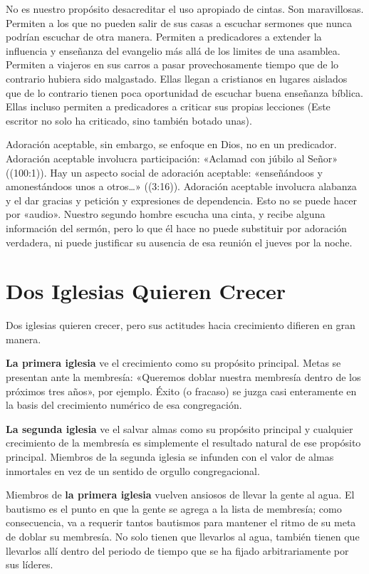 \documentclass[12pt, twoside, openright]{book}
\begin{document}
No es nuestro propósito desacreditar el uso apropiado de cintas. Son maravillosas. Permiten a los que no pueden salir de sus casas a escuchar sermones que nunca podrían escuchar de otra manera. Permiten a predicadores a extender la influencia y enseñanza del evangelio más allá de los limites de una asamblea. Permiten a viajeros en sus carros a pasar provechosamente tiempo que de lo contrario hubiera sido malgastado. Ellas llegan a cristianos en lugares aislados que de lo contrario tienen poca oportunidad de escuchar buena enseñanza bíblica. Ellas incluso permiten a predicadores a criticar sus propias lecciones (Este escritor no solo ha criticado, sino también botado unas).

Adoración aceptable, sin embargo, se enfoque en Dios, no en un predicador. Adoración aceptable involucra participación: «Aclamad con júbilo al Señor» ((100:1)). Hay un aspecto social de adoración aceptable: «enseñándoos y amonestándoos unos a otros…» ((3:16)). Adoración aceptable involucra alabanza y el dar gracias y petición y expresiones de dependencia. Esto no se puede hacer por «audio». Nuestro segundo hombre escucha una cinta, y recibe alguna información del sermón, pero lo que él hace no puede substituir por adoración verdadera, ni puede justificar su ausencia de esa reunión el jueves por la noche. 

\section{Dos Iglesias Quieren Crecer}
Dos iglesias quieren crecer, pero sus actitudes hacia crecimiento difieren en gran manera.

\textbf{La primera iglesia} ve el crecimiento como su propósito principal. Metas se presentan ante la membresía: «Queremos doblar nuestra membresía dentro de los próximos tres años», por ejemplo. Éxito (o fracaso) se juzga casi enteramente en la basis del crecimiento numérico de esa congregación. 

\textbf{La segunda iglesia} ve el salvar almas como su propósito principal y cualquier crecimiento de la membresía es simplemente el resultado natural de ese propósito principal. Miembros de la segunda iglesia se infunden con el valor de almas inmortales en vez de un sentido de orgullo congregacional. 

Miembros de \textbf{la primera iglesia} vuelven ansiosos de llevar la gente al agua. El bautismo es el punto en que la gente se agrega a la lista de membresía; como consecuencia, va a requerir tantos bautismos para mantener el ritmo de su meta de doblar su membresía. No solo tienen que llevarlos al agua, también tienen que llevarlos allí dentro del periodo de tiempo que se ha fijado arbitrariamente por sus líderes. 
\end{document}
